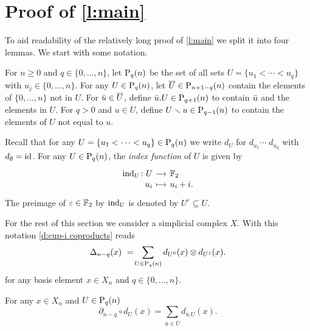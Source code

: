 
\section{Proof of \cref{l:main}} \label{s:proof}

To aid readability of the relatively long proof of \cref{l:main} we split it into four lemmas.
We start with some notation.

\begin{definition}
	For $n \geq0$ and $q \in \{0, \dots, n\}$, let $\P_q(n)$ be the set of all sets $U = \{u_1 < \cdots < u_q\}$ with $u_j \in \{0, \dots, n\}$.
	For any $U \in \P_q(n)$, let $\overline{U} \in \P_{n+1-q}(n)$ contain the elements of $\{0, \dots, n\}$ not in $U$. For $\bu \in \overline{U}$, define $\bu.U \in \P_{q+1}(n)$ to contain $\bu$ and the elements in $U$.
	For $q > 0$ and $u \in U$, define $U \sm u \in \P_{q-1}(n)$ to contain the elements of $U$ not equal to $u$.
\end{definition}

Recall that for any $U = \{u_1 < \cdots < u_q\} \in \P_q(n)$ we write $d_U$ for $d_{u_1} \cdots \; d_{u_q}$ with $d_{\emptyset} = \id$.
For any $U \in \P_q(n)$, the \textit{index function} of $U$ is given by
\begin{equation*}
\begin{tikzcd}[row sep=-3pt, column sep=small,
/tikz/column 1/.append style={anchor=base east},
/tikz/column 2/.append style={anchor=base west}]
\ind_U \colon U \arrow[r] & \F_2 \\
u_i \arrow[r, mapsto] & u_i + i.
\end{tikzcd}
\end{equation*}
The preimage of $\varepsilon \in \F_2$ by $\ind_{U}$ is denoted by $U^\varepsilon \subseteq U$.

For the rest of this section we consider a simplicial complex $X$.
With this notation \cref{d:cup-i coproducts} reads
\begin{equation*}
\Delta_{n-q}(x)\ =\! \sum_{U \in \P_q(n)} d_{U^0}(x) \otimes d_{U^1}(x).
\end{equation*}
for any basis element $x \in X_n$ and $q \in \{0, \dots, n\}$.

\begin{lemma} \label{l:partial dU = dxU}
	For any $x \in X_n$ and $U \in \P_{q}(n)$
	\begin{equation} \label{lemma1: existence:eq1}
	\partial_{n-q} \circ d_U(x) = \sum_{\bar{u} \in \overline{U}} d_{\bar{u}.U}(x).
	\end{equation}
\end{lemma}

